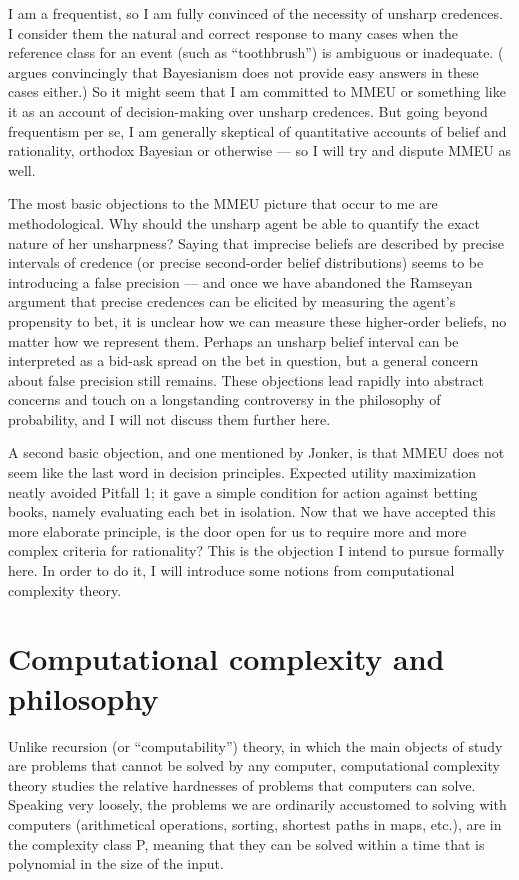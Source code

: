 \documentclass[letterpaper,12pt]{article}
\begin{document}
I am a frequentist, so I am fully convinced of the necessity of unsharp credences. I consider them the natural and correct response to many cases when the reference class for an event (such as ``toothbrush'') is ambiguous or inadequate. (\cite{DBLP:journals/synthese/Hajek07} argues convincingly that Bayesianism does not provide easy answers in these cases either.) So it might seem that I am committed to MMEU or something like it as an account of decision-making over unsharp credences. But going beyond frequentism per se, I am generally skeptical of quantitative accounts of belief and rationality, orthodox Bayesian or otherwise --- so I will try and dispute MMEU as well.

The most basic objections to the MMEU picture that occur to me are methodological. Why should the unsharp agent be able to quantify the exact nature of her unsharpness? Saying that imprecise beliefs are described by precise intervals of credence (or precise second-order belief distributions) seems to be introducing a false precision --- and once we have abandoned the Ramseyan argument that precise credences can be elicited by measuring the agent's propensity to bet, it is unclear how we can measure these higher-order beliefs, no matter how we represent them. Perhaps an unsharp belief interval can be interpreted as a bid-ask spread on the bet in question, but a general concern about false precision still remains. These objections lead rapidly into abstract concerns and touch on a longstanding controversy in the philosophy of probability, and I will not discuss them further here.

A second basic objection, and one mentioned by Jonker, is that MMEU does not seem like the last word in decision principles. Expected utility maximization neatly avoided Pitfall 1; it gave a simple condition for action against betting books, namely evaluating each bet in isolation. Now that we have accepted this more elaborate principle, is the door open for us to require more and more complex criteria for rationality? This is the objection I intend to pursue formally here. In order to do it, I will introduce some notions from computational complexity theory.

\section{Computational complexity and philosophy}
Unlike recursion (or ``computability'') theory, in which the main objects of study are problems that cannot be solved by any computer, computational complexity theory studies the relative hardnesses of problems that computers can solve. Speaking very loosely, the problems we are ordinarily accustomed to solving with computers (arithmetical operations, sorting, shortest paths in maps, etc.), are in the complexity class P, meaning that they can be solved within a time that is polynomial in the size of the input.
\end{document}
